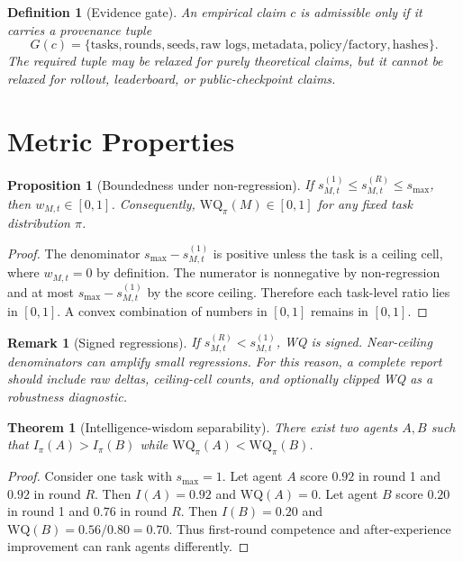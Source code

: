 \documentclass[11pt]{article}
\newtheorem{definition}{Definition}
\newtheorem{theorem}{Theorem}
\newtheorem{proposition}{Proposition}
\newtheorem{remark}{Remark}
\begin{document}
\begin{definition}[Evidence gate]
An empirical claim $c$ is admissible only if it carries a provenance tuple
\[
G(c)=\{\text{tasks},\text{rounds},\text{seeds},\text{raw logs},\text{metadata},\text{policy/factory},\text{hashes}\}.
\]
The required tuple may be relaxed for purely theoretical claims, but it cannot be relaxed for rollout, leaderboard, or public-checkpoint claims.
\end{definition}

\section{Metric Properties}

\begin{proposition}[Boundedness under non-regression]
If $s_{M,t}^{(1)}\le s_{M,t}^{(R)}\le s_{\max}$, then $w_{M,t}\in[0,1]$.
Consequently, $\mathrm{WQ}_{\pi}(M)\in[0,1]$ for any fixed task distribution $\pi$.
\end{proposition}

\begin{proof}
The denominator $s_{\max}-s_{M,t}^{(1)}$ is positive unless the task is a ceiling cell, where $w_{M,t}=0$ by definition.
The numerator is nonnegative by non-regression and at most $s_{\max}-s_{M,t}^{(1)}$ by the score ceiling.
Therefore each task-level ratio lies in $[0,1]$.
A convex combination of numbers in $[0,1]$ remains in $[0,1]$.
\end{proof}

\begin{remark}[Signed regressions]
If $s_{M,t}^{(R)}<s_{M,t}^{(1)}$, WQ is signed.
Near-ceiling denominators can amplify small regressions.
For this reason, a complete report should include raw deltas, ceiling-cell counts, and optionally clipped WQ as a robustness diagnostic.
\end{remark}

\begin{theorem}[Intelligence-wisdom separability]
There exist two agents $A,B$ such that $I_\pi(A)>I_\pi(B)$ while $\mathrm{WQ}_{\pi}(A)<\mathrm{WQ}_{\pi}(B)$.
\end{theorem}

\begin{proof}
Consider one task with $s_{\max}=1$.
Let agent $A$ score $0.92$ in round 1 and $0.92$ in round $R$.
Then $I(A)=0.92$ and $\mathrm{WQ}(A)=0$.
Let agent $B$ score $0.20$ in round 1 and $0.76$ in round $R$.
Then $I(B)=0.20$ and $\mathrm{WQ}(B)=0.56/0.80=0.70$.
Thus first-round competence and after-experience improvement can rank agents differently.
\end{proof}
\end{document}
